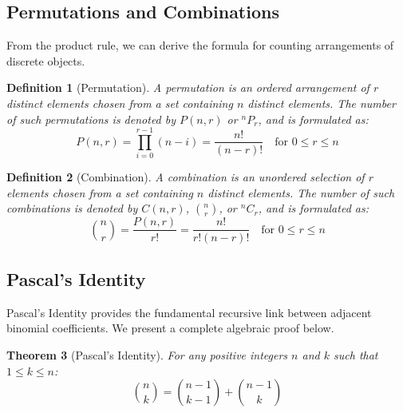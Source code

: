 \documentclass[10pt,journal,compsoc,onecolumn]{IEEEtran}
\newtheorem{theorem}{Theorem}
\newtheorem{definition}[theorem]{Definition}
\begin{document}
\subsection{Permutations and Combinations}

From the product rule, we can derive the formula for counting arrangements of discrete objects.

\begin{definition}[Permutation]
A \emph{permutation} is an ordered arrangement of $r$ distinct elements chosen from a set containing $n$ distinct elements. The number of such permutations is denoted by $P(n, r)$ or $^nP_r$, and is formulated as:
\begin{equation}
P(n, r) = \prod_{i=0}^{r-1} (n - i) = \frac{n!}{(n - r)!} \quad \text{for } 0 \leq r \leq n
\end{equation}
\end{definition}

\begin{definition}[Combination]
A \emph{combination} is an unordered selection of $r$ elements chosen from a set containing $n$ distinct elements. The number of such combinations is denoted by $C(n, r)$, $\binom{n}{r}$, or $^nC_r$, and is formulated as:
\begin{equation}
\binom{n}{r} = \frac{P(n, r)}{r!} = \frac{n!}{r!(n - r)!} \quad \text{for } 0 \leq r \leq n
\end{equation}
\end{definition}

\subsection{Pascal's Identity}

Pascal's Identity provides the fundamental recursive link between adjacent binomial coefficients. We present a complete algebraic proof below.

\begin{theorem}[Pascal's Identity]
For any positive integers $n$ and $k$ such that $1 \leq k \leq n$:
\begin{equation}
\binom{n}{k} = \binom{n - 1}{k - 1} + \binom{n - 1}{k}
\end{equation}
\end{theorem}
\end{document}

